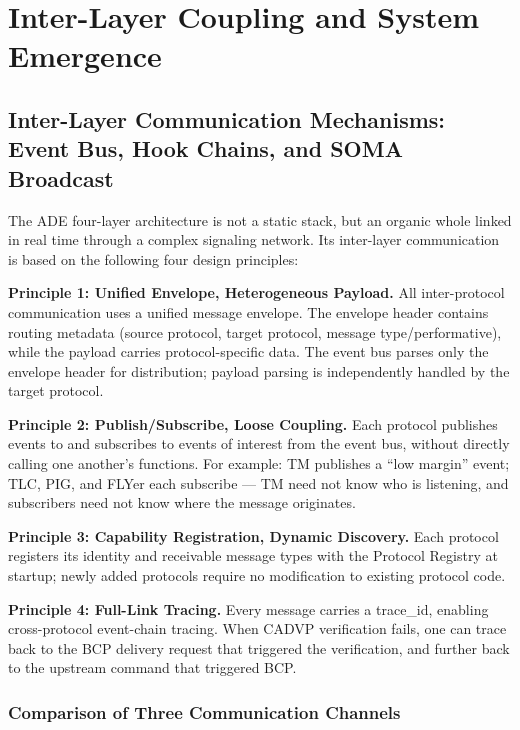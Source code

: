 \documentclass[11pt,a4paper]{article}
\begin{document}
\section{Inter-Layer Coupling and System Emergence}

\subsection{Inter-Layer Communication Mechanisms: Event Bus, Hook Chains, and SOMA Broadcast}

The ADE four-layer architecture is not a static stack, but an organic whole linked in real time through a complex signaling network. Its inter-layer communication is based on the following four design principles:

\smallskip
\noindent\textbf{Principle 1: Unified Envelope, Heterogeneous Payload.} All inter-protocol communication uses a unified message envelope. The envelope header contains routing metadata (source protocol, target protocol, message type/performative), while the payload carries protocol-specific data. The event bus parses only the envelope header for distribution; payload parsing is independently handled by the target protocol.

\noindent\textbf{Principle 2: Publish/Subscribe, Loose Coupling.} Each protocol publishes events to and subscribes to events of interest from the event bus, without directly calling one another's functions. For example: TM publishes a ``low margin'' event; TLC, PIG, and FLYer each subscribe --- TM need not know who is listening, and subscribers need not know where the message originates.

\noindent\textbf{Principle 3: Capability Registration, Dynamic Discovery.} Each protocol registers its identity and receivable message types with the Protocol Registry at startup; newly added protocols require no modification to existing protocol code.

\noindent\textbf{Principle 4: Full-Link Tracing.} Every message carries a trace\_id, enabling cross-protocol event-chain tracing. When CADVP verification fails, one can trace back to the BCP delivery request that triggered the verification, and further back to the upstream command that triggered BCP.

\subsubsection*{Comparison of Three Communication Channels}
\end{document}

